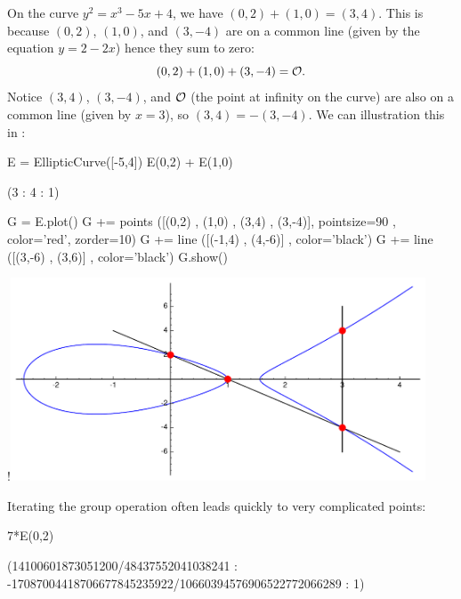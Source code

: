 \begin{example}\label{ex:ecgplaw}
On the curve $y^2=x^3-5x+4$, we have $(0,2) + (1,0) = (3,4)$.
This is because $(0,2)$, $(1,0)$, and $(3,-4)$ are on a common line
(given by the equation $y = 2 - 2x$) hence they sum to zero:
$$
  (0,2) + (1,0) + (3,-4) = \mathcal{O}.
$$
Notice $(3,4)$, $(3,-4)$, and $\mathcal{O}$ (the point at infinity on the curve) are also
on a common line (given by $x = 3$), so $(3,4)=-(3,-4)$.
We can illustration this in \sage:
\begin{sagecode}
\begin{sagecell}
E = EllipticCurve([-5,4])
E(0,2) + E(1,0)
\end{sagecell}
\begin{sageout}
(3 : 4 : 1)
\end{sageout}
\end{sagecode}
\begin{sagecode}
\begin{sagecell} %

G = E.plot()
G += points ([(0,2) , (1,0) , (3,4) , (3,-4)],
    pointsize=90 , color='red', zorder=10)
G += line ([(-1,4) , (4,-6)] , color='black')
G += line ([(3,-6) , (3,6)] , color='black')
G.show()
\end{sagecell}
\begin{sageout}[escapechar=!] %
!\includegraphics[width=0.925\textwidth]{graphics/grouplaw}
\end{sageout}
\end{sagecode} %

\noindent
Iterating the group operation often leads quickly to
very complicated points:

\begin{sagecode} %
\begin{sagecell}
7*E(0,2)
\end{sagecell}
\begin{sageout}
(14100601873051200/48437552041038241 :
-17087004418706677845235922/10660394576906522772066289 :
 1)
\end{sageout}
\end{sagecode}
\end{example}

